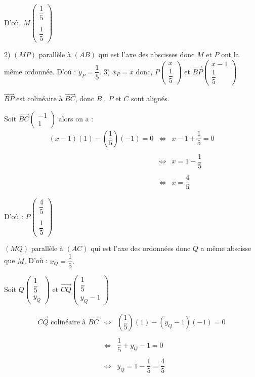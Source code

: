 \documentclass[12pt]{article}
\begin{document}
D'où, $M\begin{pmatrix}\dfrac{1}{5} \\ \\ \dfrac{1}{5}\end{pmatrix}$

2) $(MP)$ parallèle à $(AB)$ qui est l'axe des abscisses donc $M$ et $P$ ont la même ordonnée. D'où : $y_{P}=\dfrac{1}{5}.$
3) $x_{P}=x$ donc, $P\begin{pmatrix} x \\ \dfrac{1}{5}\end{pmatrix}$ et $\overrightarrow{BP}\begin{pmatrix} x-1 \\ \dfrac{1}{5}\end{pmatrix}$

$\overrightarrow{BP}$ est colinéaire à $\overrightarrow{BC}$, donc $B\;,\ P$ et $C$ sont alignés.

Soit $\overrightarrow{BC}\begin{pmatrix} -1 \\ 1\end{pmatrix}$ alors on a : $$\begin{array}{rcl} (x-1)(1)-\left(\dfrac{1}{5}\right)(-1)=0&\Leftrightarrow&x-1+\dfrac{1}{5}=0\\\\&\Leftrightarrow&x=1-\dfrac{1}{5}\\ \\&\Leftrightarrow&x=\dfrac{4}{5}\end{array}$$

D'où  : $P\begin{pmatrix}\dfrac{4}{5} \\ \\ \dfrac{1}{5}\end{pmatrix}$

$(MQ)$ parallèle à $(AC)$ qui est l'axe des ordonnées donc $Q$ a même abscisse que $M.$ D'où : $x_{Q}=\dfrac{1}{5}.$

Soit $Q\begin{pmatrix}\dfrac{1}{5} \\ y_{Q}\end{pmatrix}$ et $\overrightarrow{CQ}\begin{pmatrix}\dfrac{1}{5} \\ y_{Q}-1\end{pmatrix}$

\begin{eqnarray}\overrightarrow{CQ}\text{ colinéaire à }\overrightarrow{BC}&\Leftrightarrow&\left(\dfrac{1}{5}\right)(1)-(y_{Q}-1)(-1)=0\nonumber\\ \\ &\Leftrightarrow&\dfrac{1}{5}+y_{Q}-1=0\nonumber\\ \\ &\Leftrightarrow&y_{Q}=1-\dfrac{1}{5}=\dfrac{4}{5}\nonumber \end{eqnarray}
\end{document}

